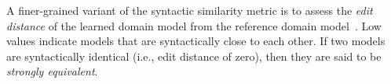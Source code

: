 
A finer-grained variant of the syntactic similarity metric is to assess the \emph{edit distance} of the learned domain model from the reference domain model~\cite{chrpa2023comparing}. Low values indicate models that are syntactically close to each other. If two models are syntactically identical (i.e., edit distance of zero), then they are said to be \textit{strongly equivalent}.







